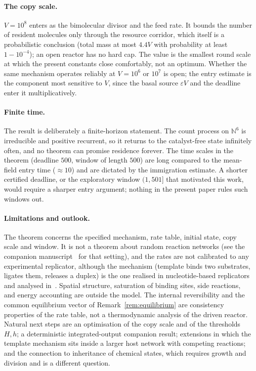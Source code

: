 \documentclass[11pt,a4paper]{article}
\theoremstyle{plain}
\theoremstyle{definition}
\theoremstyle{remark}
\newcommand{\N}{\mathbb N}
\newcommand{\eps}{\varepsilon}
\begin{document}
\paragraph{The copy scale.}
$V=10^8$ enters as the bimolecular divisor and the feed rate. It bounds the number of resident molecules only through the resource corridor, which itself is a probabilistic conclusion (total mass at most $4.4V$ with probability at least $1-10^{-4}$); an open reactor has no hard cap. The value is the smallest round scale at which the present constants close comfortably, not an optimum. Whether the same mechanism operates reliably at $V=10^6$ or $10^7$ is open; the entry estimate is the component most sensitive to $V$, since the basal source $\eps V$ and the deadline enter it multiplicatively.

\paragraph{Finite time.}
The result is deliberately a finite-horizon statement. The count process on $\N^6$ is irreducible and positive recurrent, so it returns to the catalyst-free state infinitely often, and no theorem can promise residence forever. The time scales in the theorem (deadline $500$, window of length $500$) are long compared to the mean-field entry time ($\approx10$) and are dictated by the immigration estimate. A shorter certified deadline, or the exploratory window $(1,501]$ that motivated this work, would require a sharper entry argument; nothing in the present paper rules such windows out.

\paragraph{Limitations and outlook.}
The theorem concerns the specified mechanism, rate table, initial state, copy scale and window. It is not a theorem about random reaction networks (see the companion manuscript~\citep{companion2026} for that setting), and the rates are not calibrated to any experimental replicator, although the mechanism (template binds two substrates, ligates them, releases a duplex) is the one realised in nucleotide-based replicators~\citep{vonkiedrowski1986,sievers1994} and analysed in~\citep{sakref2024}. Spatial structure, saturation of binding sites, side reactions, and energy accounting are outside the model. The internal reversibility and the common equilibrium vector of Remark~\ref{rem:equilibrium} are consistency properties of the rate table, not a thermodynamic analysis of the driven reactor. Natural next steps are an optimisation of the copy scale and of the thresholds $H,h$; a deterministic integrated-output companion result; extensions in which the template mechanism sits inside a larger host network with competing reactions; and the connection to inheritance of chemical states, which requires growth and division and is a different question.
\end{document}
